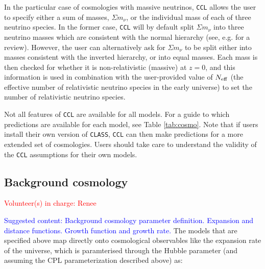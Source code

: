 \documentclass[\docopts]{\docclass}
\newcommand{\todo}[1]{\textcolor{magenta}{To do: #1}}
\newcommand{\vol}[1]{\textcolor{red}{Volunteer(s) in charge: #1}}
\newcommand{\cont}[1]{\textcolor{blue}{Suggested content: #1}}
\newcommand{\ccl}{{\tt CCL}\xspace}
\begin{document}
In the particular case of cosmologies with massive neutrinos, \ccl allows the user to specify either a sum of masses, $\Sigma m_\nu$, or the individual mass of each of three neutrino species. In the former case, \ccl will by default split $\Sigma m_\nu$ into three neutrino masses which are consistent with the normal hierarchy (see, e.g. \cite{Gerbino2017} for a review). However, the user can alternatively ask for $\Sigma m_\nu$ to be split either into masses consistent with the inverted hierarchy, or into equal masses. Each mass is then checked for whether it is non-relativistic (massive) at $z=0$, and this information is used in combination with the user-provided value of $N_{\rm eff}$ (the effective number of relativistic neutrino species in the early universe) to set the number of relativistic neutrino species.

Not all features of \ccl are available for all models. For a guide to which predictions are available for each model, see Table \ref{tab:cosmo}. Note that if users install their own version of {\tt CLASS}, {\tt CCL} can then make predictions for a more extended set of cosmologies. Users should take care to understand the validity of the {\tt CCL} assumptions for their own models.




\subsection{Background cosmology}
\vol{Renee}

\cont{Background cosmology parameter definition. Expansion and distance functions. Growth function and growth rate.}
The models that are specified above map directly onto cosmological observables like the expansion rate of the universe, which is paramterised through the Hubble parameter (and assuming the CPL parameterization described above) as:
\end{document}
